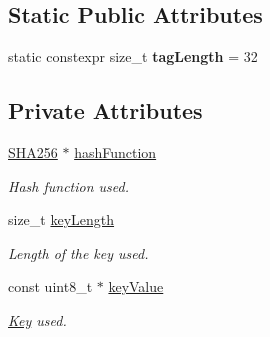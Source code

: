 \subsection*{Static Public Attributes}
\begin{DoxyCompactItemize}
\item 
\hypertarget{classHMAC_a0657172b72675134e3fdb5b3eb2f9a06}{}static constexpr size\+\_\+t {\bfseries tag\+Length} = 32\label{classHMAC_a0657172b72675134e3fdb5b3eb2f9a06}

\end{DoxyCompactItemize}
\subsection*{Private Attributes}
\begin{DoxyCompactItemize}
\item 
\hypertarget{classHMAC_a5034564d06003b6233cb90839b1cdecf}{}\hyperlink{classSHA256}{S\+H\+A256} $\ast$ \hyperlink{classHMAC_a5034564d06003b6233cb90839b1cdecf}{hash\+Function}\label{classHMAC_a5034564d06003b6233cb90839b1cdecf}

\begin{DoxyCompactList}\small\item\em Hash function used. \end{DoxyCompactList}\item 
\hypertarget{classHMAC_ac97de604a0d3a2f209b8ee75002ce315}{}size\+\_\+t \hyperlink{classHMAC_ac97de604a0d3a2f209b8ee75002ce315}{key\+Length}\label{classHMAC_ac97de604a0d3a2f209b8ee75002ce315}

\begin{DoxyCompactList}\small\item\em Length of the key used. \end{DoxyCompactList}\item 
\hypertarget{classHMAC_a1f87b94866685a126a2d5a4882b81a7e}{}const uint8\+\_\+t $\ast$ \hyperlink{classHMAC_a1f87b94866685a126a2d5a4882b81a7e}{key\+Value}\label{classHMAC_a1f87b94866685a126a2d5a4882b81a7e}

\begin{DoxyCompactList}\small\item\em \hyperlink{classKey}{Key} used. \end{DoxyCompactList}\end{DoxyCompactItemize}
